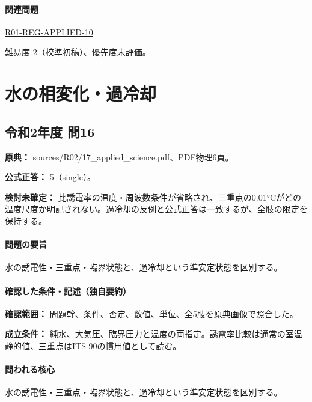 \paragraph{関連問題} \hyperref[q:r01-reg-applied-10]{R01-REG-APPLIED-10}

\par 難易度 2（校準初稿）、優先度未評価。

\section{水の相変化・過冷却}

\subsection{令和2年度 問16}
\label{q:r02-reg-applied-16}

\noindent\textbf{原典：} sources/R02/17\_applied\_science.pdf、PDF物理6頁。

\textbf{公式正答：} 5（single）。

\par\textbf{検討未確定：} 比誘電率の温度・周波数条件が省略され、三重点の0.01°Cがどの温度尺度か明記されない。過冷却の反例と公式正答は一致するが、全肢の限定を保持する。

\paragraph{問題の要旨} 水の誘電性・三重点・臨界状態と、過冷却という準安定状態を区別する。

\paragraph{確認した条件・記述（独自要約）}\mbox{}\par

\noindent\textbf{確認範囲：} 問題幹、条件、否定、数値、単位、全5肢を原典画像で照合した。\par

\noindent\textbf{成立条件：} 純水、大気圧、臨界圧力と温度の両指定。誘電率比較は通常の室温静的値、三重点はITS-90の慣用値として読む。\par

\paragraph{問われる核心} 水の誘電性・三重点・臨界状態と、過冷却という準安定状態を区別する。

